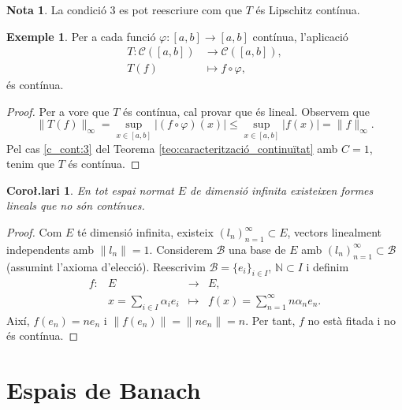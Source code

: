 \documentclass[12pt]{book}
\newtheorem{coro}[teorema]{Coro\l.lari}
\theoremstyle{definition}
\theoremstyle{nota}
\newtheorem{nota}[teorema]{Nota}
\theoremstyle{exemple}
\newtheorem{exemple}[teorema]{Exemple}
\begin{document}
\begin{nota}
  La condició 3 es pot reescriure com que $T$ és Lipschitz contínua.
\end{nota}

\begin{exemple}
  Per a cada funció $\varphi : [a,b] \to [a,b]$ contínua, l'aplicació
  \begin{align*}
    T : \mathcal C([a,b]) &\longrightarrow \mathcal C([a,b]), \\
    T (f) &\longmapsto f \circ \varphi, 
  \end{align*}
  és contínua.
\end{exemple}

\begin{proof}
  Per a vore que $T$ és contínua, cal provar que és lineal. Observem
  que
  \[
    \|T(f)\|_\infty = \sup_{x\in[a,b]} \left|(f\circ\varphi)(x)\right|
    \leq \sup_{x\in[a,b]}|f(x)| = \|f\|_\infty.
  \]
  Pel cas \ref{c_cont:3} del Teorema
  \ref{teo:caracterització_continuïtat} amb $C=1$, tenim que $T$ és
  contínua.
\end{proof}

\begin{coro}
  En tot espai normat $E$ de dimensió infinita existeixen formes
  lineals que no són contínues.
\end{coro}

\begin{proof}
  Com $E$ té dimensió infinita, existeix
  $(l_n)_{n=1}^\infty \subset E$, vectors linealment independents amb
  $\|l_n\| = 1$. Considerem $\mathcal{B}$ una base de $E$ amb
  $(l_n)_{n=1}^\infty \subset \mathcal{B}$ (assumint l'axioma
  d'elecció). Reescrivim $\mathcal{B} = \{e_i\}_{i \in I}$,
  $\mathbb{N} \subset I$ i definim
  \begin{equation*}
    \begin{array}{lrcl}
      f : & E &\longrightarrow& E, \\
          & x = \sum\limits_{i \in I}\alpha_ie_i
              &\longmapsto& f(x) = \sum\limits_{n=1}^{\infty} n\alpha_ne_n.
    \end{array}
  \end{equation*}
  Així, $f(e_n) = ne_n$ i $\|f(e_n)\| = \|ne_n\| = n$. Per tant, $f$
  no està fitada i no és contínua.
\end{proof}

\section{Espais de Banach}
\end{document}

